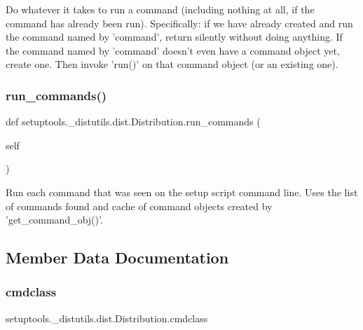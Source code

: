 \begin{DoxyVerb}Do whatever it takes to run a command (including nothing at all,
if the command has already been run).  Specifically: if we have
already created and run the command named by 'command', return
silently without doing anything.  If the command named by 'command'
doesn't even have a command object yet, create one.  Then invoke
'run()' on that command object (or an existing one).
\end{DoxyVerb}
 \mbox{\label{classsetuptools_1_1__distutils_1_1dist_1_1Distribution_a380bd700672c35b06b2262836c2b1320}} 
\subsubsection{\texorpdfstring{run\+\_\+commands()}{run\_commands()}}
{\footnotesize\ttfamily def setuptools.\+\_\+distutils.\+dist.\+Distribution.\+run\+\_\+commands (\begin{DoxyParamCaption}\item[{}]{self }\end{DoxyParamCaption})}

\begin{DoxyVerb}Run each command that was seen on the setup script command line.
Uses the list of commands found and cache of command objects
created by 'get_command_obj()'.
\end{DoxyVerb}
 

\subsection{Member Data Documentation}
\mbox{\label{classsetuptools_1_1__distutils_1_1dist_1_1Distribution_a0f26daff25283b455920efb4671fae48}} 
\subsubsection{\texorpdfstring{cmdclass}{cmdclass}}
{\footnotesize\ttfamily setuptools.\+\_\+distutils.\+dist.\+Distribution.\+cmdclass}

